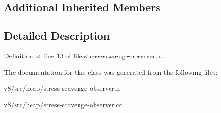 \subsection*{Additional Inherited Members}


\subsection{Detailed Description}


Definition at line 13 of file stress-\/scavenge-\/observer.\+h.



The documentation for this class was generated from the following files\+:\begin{DoxyCompactItemize}
\item 
v8/src/heap/stress-\/scavenge-\/observer.\+h\item 
v8/src/heap/stress-\/scavenge-\/observer.\+cc\end{DoxyCompactItemize}
